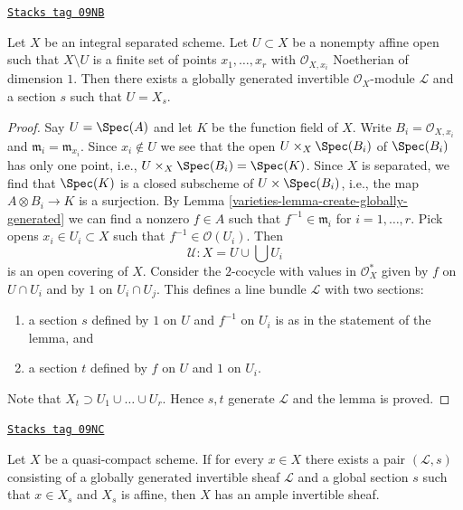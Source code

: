 \begin{lemma}
\label{varieties-lemma-find-globally-generated}
\href{https://stacks.math.columbia.edu/tag/09NB}{\texttt{Stacks tag 09NB}}

Let $X$ be an integral separated scheme. Let $U \subset X$ be a nonempty
affine open such that $X \setminus U$ is a finite set of points
$x_1, \ldots, x_r$ with $\mathcal{O}_{X, x_i}$ Noetherian of dimension $1$.
Then there exists a globally generated invertible $\mathcal{O}_X$-module
$\mathcal{L}$ and a section $s$ such that $U = X_s$.
\end{lemma}

\begin{proof}

Say $U = \Spec(A)$ and let $K$ be the function field of $X$.
Write $B_i = \mathcal{O}_{X, x_i}$ and $\mathfrak m_i = \mathfrak m_{x_i}$.
Since $x_i \not \in U$ we see that the open
$U \times_X \Spec(B_i)$ of $\Spec(B_i)$ has only one point, i.e.,
$U \times_X \Spec(B_i) = \Spec(K)$.
Since $X$ is separated, we find that $\Spec(K)$ is a closed subscheme
of $U \times \Spec(B_i)$, i.e., the map $A \otimes B_i \to K$ is a surjection.
By Lemma \ref{varieties-lemma-create-globally-generated} we can find a nonzero
$f \in A$ such that $f^{-1} \in \mathfrak m_i$ for $i = 1, \ldots, r$.
Pick opens $x_i \in U_i \subset X$ such that $f^{-1} \in \mathcal{O}(U_i)$.
Then
$$
\mathcal{U} : X = U \cup \bigcup U_i
$$
is an open covering of $X$. Consider the $2$-cocycle with values
in $\mathcal{O}_X^*$ given by $f$ on $U \cap U_i$ and by
$1$ on $U_i \cap U_j$. This defines a line bundle $\mathcal{L}$
with two sections:
\begin{enumerate}
\item a section $s$ defined by $1$ on $U$
and $f^{-1}$ on $U_i$ is as in the statement of the lemma, and
\item a section $t$ defined by $f$ on $U$ and
$1$ on $U_i$.
\end{enumerate}
Note that $X_t \supset U_1 \cup \ldots \cup U_r$.
Hence $s, t$ generate $\mathcal{L}$ and the lemma is proved.
\end{proof}

\begin{lemma}
\label{varieties-lemma-enough-globally-generated-ample}
\href{https://stacks.math.columbia.edu/tag/09NC}{\texttt{Stacks tag 09NC}}

Let $X$ be a quasi-compact scheme. If for every $x \in X$
there exists a pair $(\mathcal{L}, s)$ consisting of a globally generated
invertible sheaf $\mathcal{L}$ and a global section $s$ such that
$x \in X_s$ and $X_s$ is affine, then $X$ has an ample invertible
sheaf.
\end{lemma}

